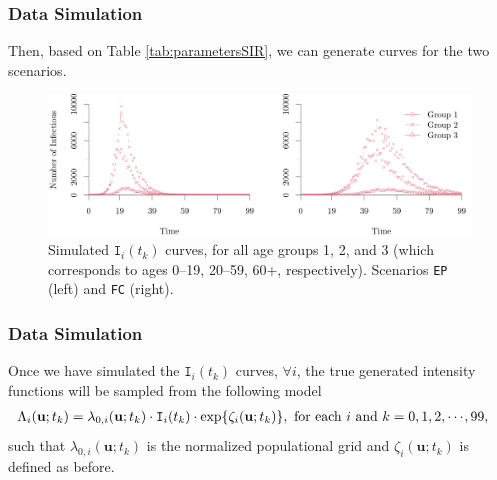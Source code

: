 \documentclass[12pt, aspectratio = 169]{beamer} %
\begin{document}
	\begin{frame}[t]
		\frametitle{Data Simulation}
		\justifying
		
		Then, based on Table \ref{tab:parametersSIR}, we can generate curves for the two scenarios.
		
		\begin{figure}[!ht]
			\centering
			\includegraphics[width = 1\textwidth]{Images/SIRplots.png}\vspace{-6pt}
			\caption{\justifying Simulated $\texttt{I}_i(t_k)$ curves, for all age groups 1, 2, and 3 (which corresponds to ages 0--19, 20--59, 60+, respectively). Scenarios \texttt{EP} (left) and \texttt{FC} (right).}
			\label{fig:simulatedSIR}
		\end{figure}
		
	\end{frame}
	
	\begin{frame}[t]
		\frametitle{Data Simulation}
		\justifying
		
		Once we have simulated the $\texttt{I}_i(t_k)$ curves, $\forall i$, the true generated intensity functions will be sampled from the following model 
		\begin{align*}
			\Lambda_i(\mathbf{u}; t_k) &= \lambda_{0, i}(\mathbf{u}; t_k) \cdot \texttt{I}_i(t_k) \cdot \exp\{\zeta_i(\mathbf{u}; t_k)\}, \text{ for each } i \text{ and } k = 0, 1, 2, \cdots\hspace{-1pt}, 99,
		\end{align*}
		such that $\lambda_{0, i}(\mathbf{u}; t_k)$ is the normalized populational grid and  $\zeta_i(\mathbf{u}; t_k)$  is defined as before.
		
	\end{frame}
\end{document}
